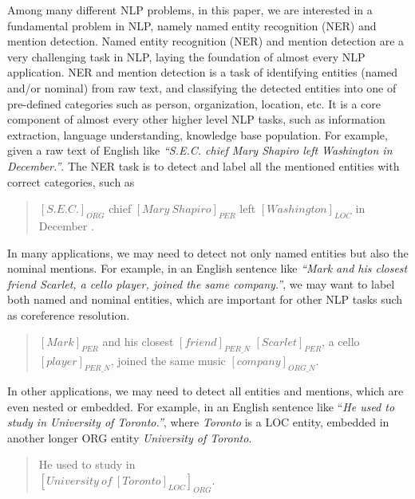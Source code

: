 \documentclass[11pt,a4paper]{article}
\begin{document}
Among many different NLP problems, in this paper, we are interested in a fundamental problem in NLP, namely named entity recognition (NER) and mention detection. Named entity recognition (NER) and mention detection are a very  challenging task in NLP, laying the foundation of almost every NLP application.
NER and mention detection is a task of identifying entities (named and/or nominal) from raw text, and classifying  the detected entities into one of pre-defined categories such as person, organization, location, etc.  
It is a core component of almost every other higher level NLP tasks, such as information extraction, language understanding, knowledge base population.  For example, given a raw text of English like {\it ``S.E.C. chief Mary Shapiro left Washington in December.''}. The NER task is to detect and label all the mentioned entities with correct  categories, such as
\begin{quote}
	\label{emp:4types}
	\small
	${[S.E.C.]}_{ORG}$ chief ${[Mary\ Shapiro]}_{PER}$ left ${[Washington]}_{LOC}$ in December .
\end{quote}

In many applications, we may need to detect not only named entities but also the nominal mentions. For example, in an English sentence like {\it ``Mark and his closest friend Scarlet, a cello player, joined the same company.''}, we may want to label both named and nominal entities, which are important for other NLP tasks such as coreference resolution. 

\begin{quote}
	\label{emp:10types}
	\small
	$[Mark]_{PER}$ and his closest $[friend]_{PER\_N}$ $[Scarlet]_{PER}$, a cello $[player]_{PER\_N}$, joined the same music $[company]_{ORG\_N}$.
\end{quote}

In other applications, we may need to detect all entities and mentions, which are even nested or embedded. For example, in an English sentence like {``\it He used to study in University of Toronto.''}, where {\it Toronto} is a LOC entity, embedded in another longer ORG entity {\it University of Toronto}.

\begin{quote}
	\label{emp:nested-ex}
	\small
	He used to study in \\  ${[University\ of\ {[Toronto]}_{LOC}]}_{ORG}$.
\end{quote}
\end{document}
